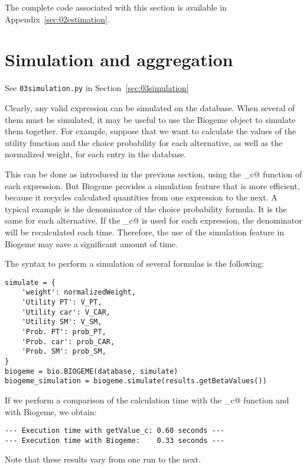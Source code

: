 \documentclass[12pt,a4paper]{article}
\begin{document}
The complete code associated with this section 
is available in Appendix~\ref{sec:02estimation}.

\section{Simulation and aggregation}

\begin{flushright}
See \lstinline$03simulation.py$ in Section~\ref{sec:03simulation}
\end{flushright}

Clearly, any valid expression can be simulated on the database. When
several of them must be simulated, it may be useful to use the Biogeme
object to simulate them together. For example, suppose that we want to
calculate the values of the utility function and the choice
probability for each alternative, as well as the normalized weight,
for each entry in the database.

This can be done as introduced in the previous section, using the
\lstinline@getValue_c@ function of each expression. But Biogeme
provides a simulation feature that is more efficient, because it
recycles calculated quantities from one expression to the next. A
typical example is the denominator of the choice probability
formula. It is the same for each alternative. If the
\lstinline@getValue_c@ is used for each expression, the denominator
will be recalculated each time. Therefore, the use of the simulation
feature in Biogeme may save a significant amount of time.

The syntax to perform a simulation of several formulas is the
following:

\begin{lstlisting}[style=nonumbers]
simulate = {
    'weight': normalizedWeight,
    'Utility PT': V_PT,
    'Utility car': V_CAR,
    'Utility SM': V_SM,
    'Prob. PT': prob_PT,
    'Prob. car': prob_CAR,
    'Prob. SM': prob_SM,
}
biogeme = bio.BIOGEME(database, simulate)
biogeme_simulation = biogeme.simulate(results.getBetaValues())
\end{lstlisting}

If we perform a comparison of the calculation time with the
\lstinline@getValue_c@ function and with Biogeme, we obtain:
\begin{lstlisting}[style=nonumbers]
--- Execution time with getValue_c: 0.60 seconds ---
--- Execution time with Biogeme:    0.33 seconds ---
\end{lstlisting}
Note that these results vary from one run to the next. 
\end{document}

